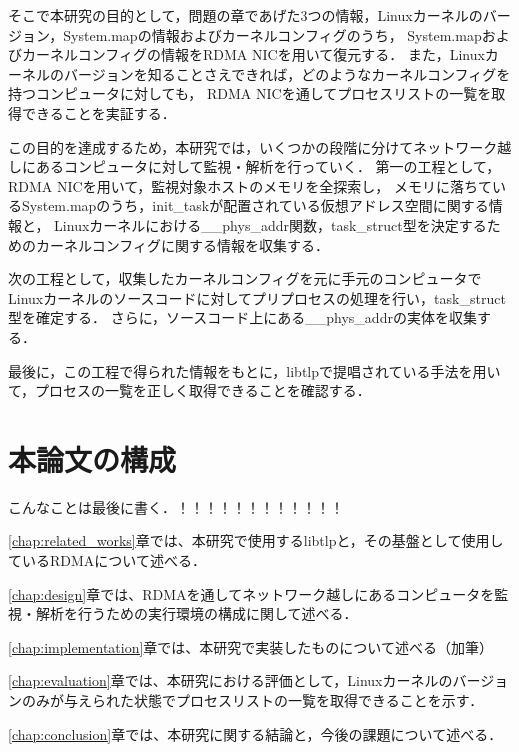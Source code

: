 そこで本研究の目的として，問題の章であげた3つの情報，Linuxカーネルのバージョン，System.mapの情報およびカーネルコンフィグのうち，
System.mapおよびカーネルコンフィグの情報をRDMA NICを用いて復元する．
また，Linuxカーネルのバージョンを知ることさえできれば，どのようなカーネルコンフィグを持つコンピュータに対しても，
RDMA NICを通してプロセスリストの一覧を取得できることを実証する．

この目的を達成するため，本研究では，いくつかの段階に分けてネットワーク越しにあるコンピュータに対して監視・解析を行っていく．
第一の工程として，RDMA NICを用いて，監視対象ホストのメモリを全探索し，
メモリに落ちているSystem.mapのうち，init_taskが配置されている仮想アドレス空間に関する情報と，
Linuxカーネルにおける__phys_addr関数，task_struct型を決定するためのカーネルコンフィグに関する情報を収集する．

次の工程として，収集したカーネルコンフィグを元に手元のコンピュータでLinuxカーネルのソースコードに対してプリプロセスの処理を行い，task_struct型を確定する．
さらに，ソースコード上にある__phys_addrの実体を収集する．

最後に，この工程で得られた情報をもとに，libtlpで提唱されている手法を用いて，プロセスの一覧を正しく取得できることを確認する．

\section{本論文の構成}

こんなことは最後に書く．！！！！！！！！！！！！

\ref{chap:related_works}章では、本研究で使用するlibtlpと，その基盤として使用しているRDMAについて述べる．

\ref{chap:design}章では、RDMAを通してネットワーク越しにあるコンピュータを監視・解析を行うための実行環境の構成に関して述べる．

\ref{chap:implementation}章では、本研究で実装したものについて述べる（加筆）

\ref{chap:evaluation}章では、本研究における評価として，Linuxカーネルのバージョンのみが与えられた状態でプロセスリストの一覧を取得できることを示す．

\ref{chap:conclusion}章では、本研究に関する結論と，今後の課題について述べる．
